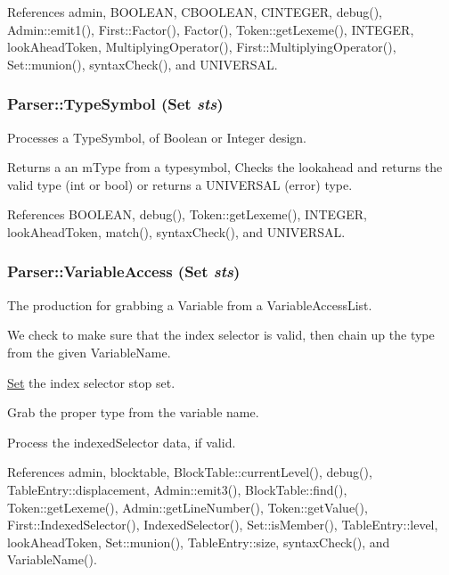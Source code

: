 References admin, BOOLEAN, CBOOLEAN, CINTEGER, debug(), Admin::emit1(), First::Factor(), Factor(), Token::getLexeme(), INTEGER, lookAheadToken, MultiplyingOperator(), First::MultiplyingOperator(), Set::munion(), syntaxCheck(), and UNIVERSAL.

\hypertarget{classParser_acc92d496e62aa2a482092dea20de2e67}{
\subsubsection[{TypeSymbol}]{ Parser::TypeSymbol ({\bf Set} {\em sts})}}
\label{classParser_acc92d496e62aa2a482092dea20de2e67}


Processes a TypeSymbol, of Boolean or Integer design. 

Returns a an mType from a typesymbol, Checks the lookahead and returns the valid type (int or bool) or returns a UNIVERSAL (error) type. 

References BOOLEAN, debug(), Token::getLexeme(), INTEGER, lookAheadToken, match(), syntaxCheck(), and UNIVERSAL.

\hypertarget{classParser_aef1c7098390f845332d10b95778aee37}{
\subsubsection[{VariableAccess}]{ Parser::VariableAccess ({\bf Set} {\em sts})}}
\label{classParser_aef1c7098390f845332d10b95778aee37}


The production for grabbing a Variable from a VariableAccessList. 

We check to make sure that the index selector is valid, then chain up the type from the given VariableName. 

\hyperlink{classSet}{Set} the index selector stop set.

Grab the proper type from the variable name.

Process the indexedSelector data, if valid. 



References admin, blocktable, BlockTable::currentLevel(), debug(), TableEntry::displacement, Admin::emit3(), BlockTable::find(), Token::getLexeme(), Admin::getLineNumber(), Token::getValue(), First::IndexedSelector(), IndexedSelector(), Set::isMember(), TableEntry::level, lookAheadToken, Set::munion(), TableEntry::size, syntaxCheck(), and VariableName().

